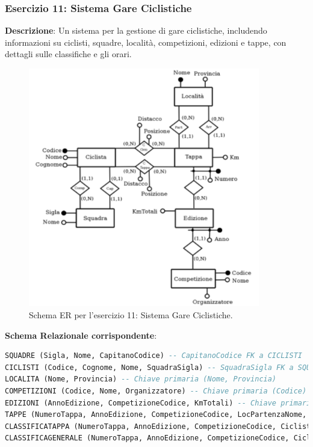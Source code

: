 \subsubsection{Esercizio 11: Sistema Gare Ciclistiche}
\textbf{Descrizione}: Un sistema per la gestione di gare ciclistiche, includendo informazioni su ciclisti, squadre, località, competizioni, edizioni e tappe, con dettagli sulle classifiche e gli orari.
\begin{figure}[h!]
    \centering
    \includegraphics[width=0.9\textwidth]{immagini/er_esercizio_11_ciclisti_tappa.png} %
    \caption{Schema ER per l'esercizio 11: Sistema Gare Ciclistiche.}
    \label{fig:er_esercizio_11_ciclisti_tappa}
\end{figure}

\textbf{Schema Relazionale corrispondente}:
\begin{lstlisting}[language=SQL]
SQUADRE (Sigla, Nome, CapitanoCodice) -- CapitanoCodice FK a CICLISTI
CICLISTI (Codice, Cognome, Nome, SquadraSigla) -- SquadraSigla FK a SQUADRE
LOCALITA (Nome, Provincia) -- Chiave primaria (Nome, Provincia)
COMPETIZIONI (Codice, Nome, Organizzatore) -- Chiave primaria (Codice)
EDIZIONI (AnnoEdizione, CompetizioneCodice, KmTotali) -- Chiave primaria (AnnoEdizione, CompetizioneCodice), FK a COMPETIZIONI
TAPPE (NumeroTappa, AnnoEdizione, CompetizioneCodice, LocPartenzaNome, LocPartenzaProvincia, LocArrivoNome, LocArrivoProvincia) -- Chiave primaria (NumeroTappa, AnnoEdizione, CompetizioneCodice), FK a EDIZIONI, FK a LOCALITA (due volte)
CLASSIFICATAPPA (NumeroTappa, AnnoEdizione, CompetizioneCodice, CiclistaCodice, Posizione, Distacco) -- FK a TAPPE, FK a CICLISTI
CLASSIFICAGENERALE (NumeroTappa, AnnoEdizione, CompetizioneCodice, CiclistaCodice, Posizione, Distacco) -- FK a TAPPE, FK a CICLISTI
\end{lstlisting}

